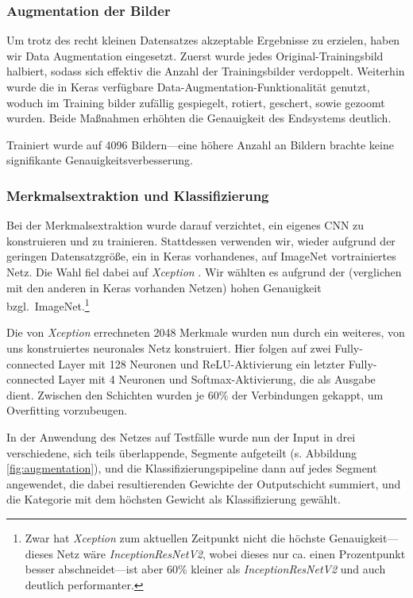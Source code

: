 \documentclass[a4,german]{article}
\begin{document}
\subsubsection{Augmentation der Bilder}
\label{sec:augmentation}

Um trotz des recht kleinen Datensatzes akzeptable Ergebnisse zu erzielen, haben wir Data Augmentation eingesetzt.
Zuerst wurde jedes Original-Trainingsbild halbiert, sodass sich effektiv die Anzahl der Trainingsbilder verdoppelt.
Weiterhin wurde die in Keras verfügbare Data-Augmentation-Funktionalität genutzt, woduch im Training bilder zufällig gespiegelt, rotiert, geschert, sowie gezoomt wurden.
Beide Maßnahmen erhöhten die Genauigkeit des Endsystems deutlich.

Trainiert wurde auf 4096 Bildern---eine höhere Anzahl an Bildern brachte keine signifikante Genauigkeitsverbesserung.


\subsubsection{Merkmalsextraktion und Klassifizierung}
\label{sec:neural}

Bei der Merkmalsextraktion wurde darauf verzichtet, ein eigenes CNN zu konstruieren und zu trainieren.
Stattdessen verwenden wir, wieder aufgrund der geringen Datensatzgröße, ein in Keras vorhandenes, auf ImageNet vortrainiertes Netz.
Die Wahl fiel dabei auf \emph{Xception} \cite{xception}.
Wir wählten es aufgrund der (verglichen mit den anderen in Keras vorhanden Netzen) hohen Genauigkeit bzgl.\ ImageNet.\footnote{Zwar hat \emph{Xception} zum aktuellen Zeitpunkt nicht die höchste Genauigkeit---dieses Netz wäre \emph{InceptionResNetV2}, wobei dieses nur ca. einen Prozentpunkt besser abschneidet---ist aber 60\% kleiner als \emph{InceptionResNetV2} und auch deutlich performanter.}

Die von \emph{Xception} errechneten 2048 Merkmale wurden nun durch ein weiteres, von uns konstruiertes neuronales Netz konstruiert.
Hier folgen auf zwei Fully-connected Layer mit 128 Neuronen und ReLU-Aktivierung ein letzter Fully-connected Layer mit 4 Neuronen und Softmax-Aktivierung, die als Ausgabe dient.
Zwischen den Schichten wurden je 60\% der Verbindungen gekappt, um Overfitting vorzubeugen.


In der Anwendung des Netzes auf Testfälle wurde nun der Input in drei verschiedene, sich teils überlappende, Segmente aufgeteilt (s. Abbildung \ref{fig:augmentation}), und die Klassifizierungspipeline dann auf jedes Segment angewendet, die dabei resultierenden Gewichte der Outputschicht summiert, und die Kategorie mit dem höchsten Gewicht als Klassifizierung gewählt.
\end{document}
